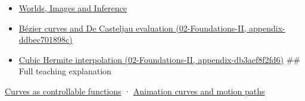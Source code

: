 \begin{itemize}
\item
  \href{Continuous\%20Notes/University\%20-\%20Worlds,\%20Images\%20and\%20Inference\%20-\%20Graphics,\%20Vision\%20and\%20Photography}{Worlds, Images and Inference}
\item
  \href{}{Bézier curves and De Casteljau evaluation (02-Foundations-II, appendix-ddbec701898c)}
\item
  \href{}{Cubic Hermite interpolation (02-Foundations-II, appendix-db3aef8f2fd6)} \#\# Full teaching explanation
\end{itemize}

\href{Continuous\%20Notes/University\%20-\%20Worlds,\%20Images\%20and\%20Inference\%20-\%20Graphics,\%20Vision\%20and\%20Photography\#Curves\%20as\%20controllable\%20functions}{Curves as controllable functions} · \href{Continuous\%20Notes/University\%20-\%20Worlds,\%20Images\%20and\%20Inference\%20-\%20Graphics,\%20Vision\%20and\%20Photography\#Animation\%20curves\%20and\%20motion\%20paths}{Animation curves and motion paths}
